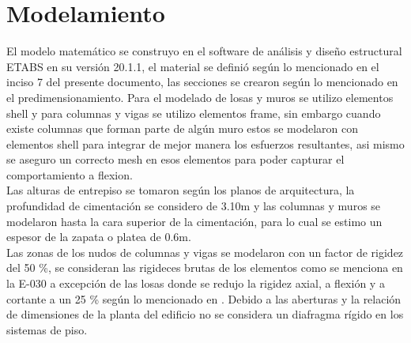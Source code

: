 \section{Modelamiento}

El modelo matemático se construyo en el software de análisis y diseño estructural ETABS en su versión 20.1.1, el material se definió según lo mencionado en el inciso 7 del presente documento, las secciones se crearon según lo mencionado en el predimensionamiento. Para el modelado de losas y muros se utilizo elementos shell y para columnas y vigas se utilizo elementos frame, sin embargo cuando existe columnas que forman parte de algún muro estos se modelaron con elementos shell para integrar de mejor manera los esfuerzos resultantes, asi mismo se aseguro un correcto mesh en esos elementos para poder capturar el comportamiento a flexion. 
\\
Las alturas de entrepiso se tomaron según los planos de arquitectura, la profundidad de cimentación se considero de 3.10m y las columnas y muros se modelaron hasta la cara superior de la cimentación, para lo cual se estimo un espesor de la zapata o platea de 0.6m. 
\\
Las zonas de los nudos de columnas y vigas se modelaron con un factor de rigidez del 50 \%, se consideran las rigideces brutas de los elementos como se menciona en la E-030 a excepción de las losas donde se redujo la rigidez axial, a flexión y a cortante a un 25 \% según lo mencionado en \cite{ACI19}. Debido a las aberturas y la relación de dimensiones de la planta del edificio no se considera un diafragma rígido en los sistemas de piso.
\\
\newpage

